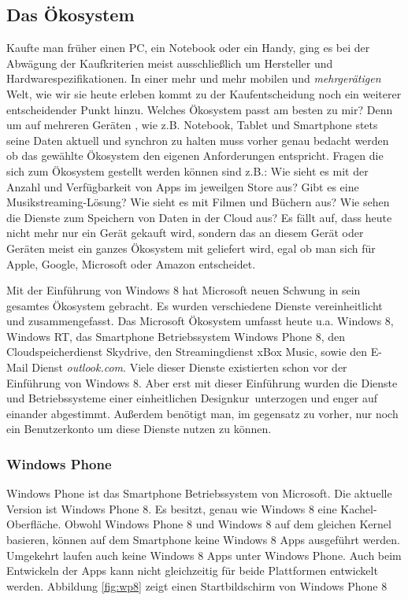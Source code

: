 \documentclass[12pt,a4paper,bibtotoc,abstracton]{scrartcl}
\begin{document}
\subsection{Das Ökosystem}
\label{subsec:ökosystem}
Kaufte man früher einen PC, ein Notebook oder ein Handy, ging es bei der Abwägung der Kaufkriterien meist ausschließlich um Hersteller und Hardwarespezifikationen. In einer mehr und mehr mobilen und \textit{mehrgerätigen} Welt, wie wir sie heute erleben kommt zu der Kaufentscheidung noch ein weiterer entscheidender Punkt hinzu. Welches Ökosystem passt am besten zu mir? Denn um auf mehreren Geräten , wie z.B. Notebook, Tablet und Smartphone stets seine Daten aktuell und synchron zu halten muss vorher genau bedacht werden ob das gewählte Ökosystem den eigenen Anforderungen entspricht. Fragen die sich zum  Ökosystem gestellt werden können sind z.B.: Wie sieht es mit der Anzahl und Verfügbarkeit von Apps im jeweilgen Store aus? Gibt es eine Musikstreaming-Lösung? Wie sieht es mit Filmen und Büchern aus? Wie sehen die Dienste zum Speichern von Daten in der Cloud aus? Es fällt auf, dass heute nicht mehr nur ein Gerät gekauft wird, sondern das an diesem Gerät oder Geräten meist ein ganzes Ökosystem mit geliefert wird, egal ob man sich für Apple, Google, Microsoft oder Amazon entscheidet. 

Mit der Einführung von Windows 8 hat Microsoft neuen Schwung in sein gesamtes Ökosystem gebracht. Es wurden verschiedene Dienste vereinheitlicht und zusammengefasst. Das Microsoft Ökosystem umfasst heute u.a. Windows 8, Windows RT, das Smartphone Betriebssystem Windows Phone 8, den Cloudspeicherdienst Skydrive, den Streamingdienst xBox Music, sowie den E-Mail Dienst \textit{outlook.com}. Viele dieser Dienste existierten schon vor der Einführung von Windows 8. Aber erst mit dieser Einführung wurden die Dienste und Betriebssysteme einer einheitlichen \glqq Designkur\grqq\ unterzogen und enger auf einander abgestimmt. Außerdem benötigt man, im gegensatz zu vorher, nur noch ein Benutzerkonto um diese Dienste nutzen zu können.

\subsubsection{Windows Phone}
\label{subsubsec:windowsphone}
Windows Phone ist das Smartphone Betriebssystem von Microsoft. Die aktuelle Version ist Windows Phone 8. Es besitzt, genau wie Windows 8 eine Kachel-Oberfläche. Obwohl Windows Phone 8 und Windows 8 auf dem gleichen Kernel basieren, können auf dem Smartphone keine Windows 8 Apps ausgeführt werden. Umgekehrt laufen auch keine Windows 8 Apps unter Windows Phone. Auch beim Entwickeln der Apps kann nicht gleichzeitig für beide Plattformen entwickelt werden. Abbildung \ref{fig:wp8} zeigt einen Startbildschirm von Windows Phone 8
\end{document}
